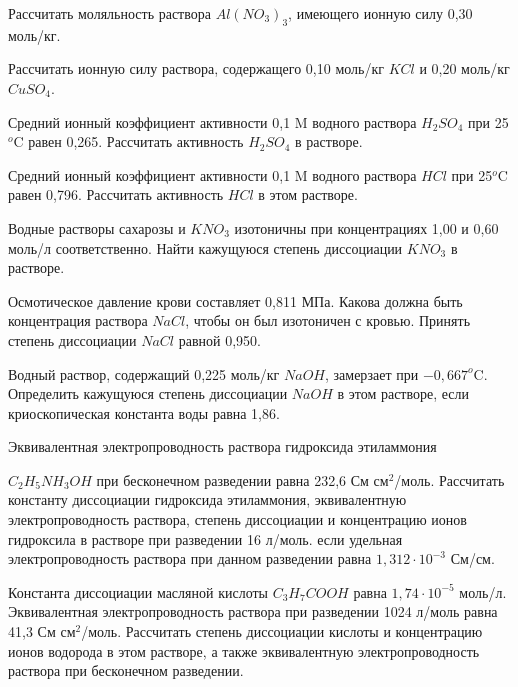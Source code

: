 \begin{Task}
Рассчитать моляльность раствора $Al(NO_{3})_{3}$, имеющего ионную силу 0,30 моль/кг.
\end{Task}
\begin{Task}
Рассчитать ионную силу раствора, содержащего 0,10 моль/кг $KCl$ и 0,20 моль/кг $CuSO_{4}$.
\end{Task}
\begin{Task}
Средний ионный коэффициент активности 0,1 M водного раствора $H_{2}SO_{4}$ при 25$^{o}$C равен 0,265. Рассчитать активность $H_{2}SO_{4}$ в растворе.
\end{Task}
\begin{Task}
Средний ионный коэффициент активности 0,1 M водного раствора $HCl$ при 25$^{o}$C равен 0,796. Рассчитать активность $HCl$ в этом растворе.
\end{Task}
\begin{Task}
Водные растворы сахарозы и $KNO_{3}$ изотоничны при концентрациях 1,00 и 0,60 моль/л соответственно. Найти кажущуюся степень диссоциации $KNO_{3}$ в растворе.
\end{Task}
\begin{Task}
Осмотическое давление крови составляет 0,811 МПа. Какова должна быть концентрация раствора $NaCl$, чтобы он был изотоничен с кровью.  Принять степень диссоциации $NaCl$ равной 0,950.
\end{Task}
\begin{Task}
Водный раствор, содержащий 0,225 моль/кг $NaOH$, замерзает при $-0,667^{o}$C. Определить кажущуюся степень диссоциации $NaOH$ в этом растворе, если криоскопическая константа воды равна 1,86.
\end{Task}
\begin{Task}
Эквивалентная электропроводность раствора гидроксида этиламмония 

$C_{2}H_{5}NH_{3}OH$ при бесконечном разведении равна 232,6 См см$^{2}$/моль. Рассчитать константу диссоциации гидроксида этиламмония, эквивалентную электропроводность раствора, степень диссоциации и концентрацию ионов гидроксила в растворе при разведении 16 л/моль. если удельная электропроводность раствора при данном разведении равна $1,312\cdot 10^{-3}$ См/см.
\end{Task}
\begin{Task}
Константа диссоциации масляной кислоты $C_{3}H_{7}COOH$ равна $1,74\cdot 10^{-5}$ моль/л. Эквивалентная электропроводность раствора при разведении 1024 л/моль равна 41,3 См см$^{2}$/моль. Рассчитать степень диссоциации кислоты и концентрацию ионов водорода в этом растворе, а также эквивалентную электропроводность раствора при бесконечном разведении.
\end{Task}
